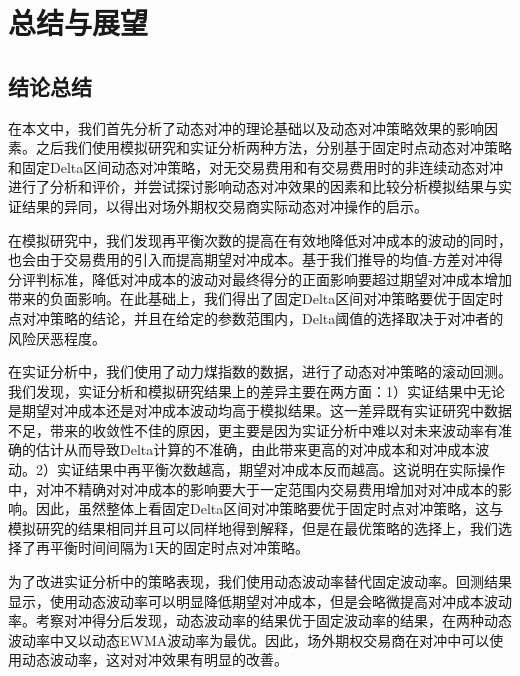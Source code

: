 
\chapter{总结与展望}
\label{chap:summary}

\section{结论总结}

在本文中，我们首先分析了动态对冲的理论基础以及动态对冲策略效果的影响因素。之后我们使用模拟研究和实证分析两种方法，分别基于固定时点动态对冲策略和固定Delta区间动态对冲策略，对无交易费用和有交易费用时的非连续动态对冲进行了分析和评价，并尝试探讨影响动态对冲效果的因素和比较分析模拟结果与实证结果的异同，以得出对场外期权交易商实际动态对冲操作的启示。

在模拟研究中，我们发现再平衡次数的提高在有效地降低对冲成本的波动的同时，也会由于交易费用的引入而提高期望对冲成本。基于我们推导的均值-方差对冲得分评判标准，降低对冲成本的波动对最终得分的正面影响要超过期望对冲成本增加带来的负面影响。在此基础上，我们得出了固定Delta区间对冲策略要优于固定时点对冲策略的结论，并且在给定的参数范围内，Delta阈值的选择取决于对冲者的风险厌恶程度。

在实证分析中，我们使用了动力煤指数的数据，进行了动态对冲策略的滚动回测。我们发现，实证分析和模拟研究结果上的差异主要在两方面：1）实证结果中无论是期望对冲成本还是对冲成本波动均高于模拟结果。这一差异既有实证研究中数据不足，带来的收敛性不佳的原因，更主要是因为实证分析中难以对未来波动率有准确的估计从而导致Delta计算的不准确，由此带来更高的对冲成本和对冲成本波动。2）实证结果中再平衡次数越高，期望对冲成本反而越高。这说明在实际操作中，对冲不精确对对冲成本的影响要大于一定范围内交易费用增加对对冲成本的影响。因此，虽然整体上看固定Delta区间对冲策略要优于固定时点对冲策略，这与模拟研究的结果相同并且可以同样地得到解释，但是在最优策略的选择上，我们选择了再平衡时间间隔为1天的固定时点对冲策略。

为了改进实证分析中的策略表现，我们使用动态波动率替代固定波动率。回测结果显示，使用动态波动率可以明显降低期望对冲成本，但是会略微提高对冲成本波动率。考察对冲得分后发现，动态波动率的结果优于固定波动率的结果，在两种动态波动率中又以动态EWMA波动率为最优。因此，场外期权交易商在对冲中可以使用动态波动率，这对对冲效果有明显的改善。

